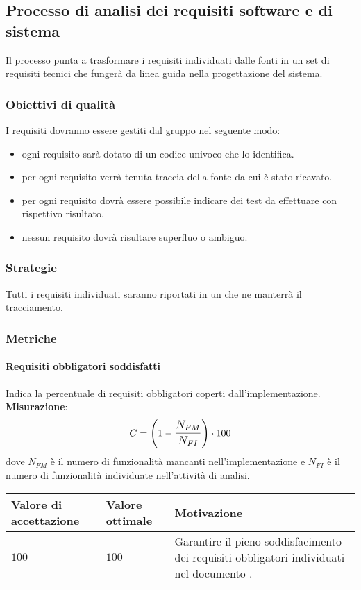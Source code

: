 \subsection{Processo di analisi dei requisiti software e di sistema}

Il processo punta a trasformare i requisiti individuati dalle fonti in un set di requisiti tecnici che fungerà da linea guida nella progettazione del sistema.

\subsubsection{Obiettivi di qualità}
I requisiti dovranno essere gestiti dal gruppo nel seguente modo:

\begin{itemize}
\item ogni requisito sarà dotato di un codice univoco che lo identifica.
\item per ogni requisito verrà tenuta traccia della fonte da cui è stato ricavato.
\item per ogni requisito dovrà essere possibile indicare dei test da effettuare con rispettivo risultato.
\item nessun requisito dovrà risultare superfluo o ambiguo.
\end{itemize}

\subsubsection{Strategie}
Tutti i requisiti individuati saranno riportati in un  che ne manterrà il tracciamento.

\subsubsection{Metriche}
\paragraph{Requisiti obbligatori soddisfatti}
Indica la percentuale di requisiti obbligatori coperti dall'implementazione. \\
\textbf{Misurazione}: 
		$$C=\left(1-\mathlarger{\frac{N_{FM}}{N_{FI}}}\right) \cdot 100$$ 
	dove $N_{FM}$ è il numero di funzionalità mancanti nell'implementazione e $N_{FI}$ è il numero di funzionalità individuate nell'attività di analisi.
	
\begin{center}
	\begin{tabular}{|P{2.5cm}|P{2.5cm}|P{6cm}|}
		\hline
			\textbf{Valore di accettazione}	& \textbf{Valore ottimale} & \textbf{Motivazione} \\
			\hline
			$100$ & $100$ & Garantire il pieno soddisfacimento dei requisiti obbligatori individuati nel documento \AdR. \\
			\hline
			\end{tabular}
\end{center}	

